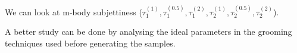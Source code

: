 \documentclass[main]{subfiles} %
\begin{document}


\doublespacing

\vspace{20pt}

We can look at m-body subjettiness ($\tau_1^{(1)},\tau_1^{(0.5)},\tau_1^{(2)},\tau_2^{(1)},\tau_2^{(0.5)},\tau_2^{(2)}$).

A better study can be done by analysing the ideal parameters in the grooming techniques used before generating the samples. 




















\biblio
\end{document}
